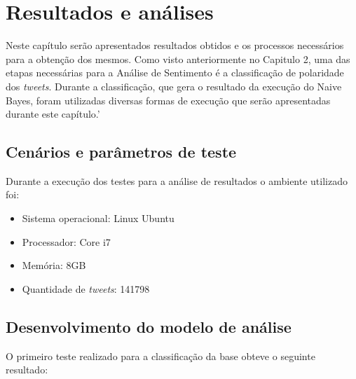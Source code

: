 \chapter{Resultados e análises}\label{cap:resultados}

Neste capítulo serão apresentados resultados obtidos e os processos necessários para a obtenção dos mesmos. Como visto anteriormente no Capitulo 2,  uma das etapas
necessárias para a Análise de Sentimento é a classificação de polaridade dos \textit{tweets}. Durante a classificação, que gera o resultado da execução do Naive Bayes, foram utilizadas diversas formas de execução que serão apresentadas durante este capítulo.'

\section{Cenários e parâmetros de teste}\label{sec:cenarios}
Durante a execução dos testes para a análise de resultados o ambiente utilizado foi:
\begin{itemize}
	\item Sistema operacional: Linux Ubuntu
	\item Processador: Core i7
	\item Memória: 8GB
	\item Quantidade de \textit{tweets}: 141798
\end{itemize}


\section{Desenvolvimento do modelo de análise}\label{sec:desenv-moda}
O primeiro teste realizado para a classificação da base obteve o seguinte resultado:
\begin{table}[]
	\caption{1º teste}
	\label{teste-1}
\end{table}

